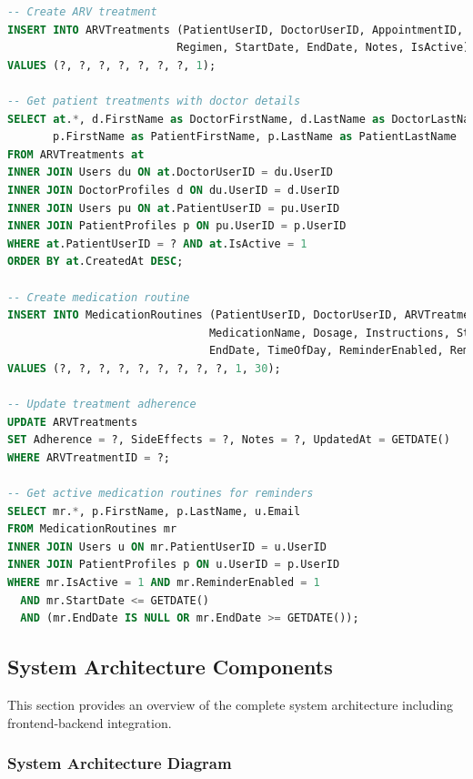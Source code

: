 \documentclass[12pt,a4paper]{article}
\begin{document}
\begin{lstlisting}[language=SQL, caption=ARV Treatment Management Queries]
-- Create ARV treatment
INSERT INTO ARVTreatments (PatientUserID, DoctorUserID, AppointmentID, 
                          Regimen, StartDate, EndDate, Notes, IsActive)
VALUES (?, ?, ?, ?, ?, ?, ?, 1);

-- Get patient treatments with doctor details
SELECT at.*, d.FirstName as DoctorFirstName, d.LastName as DoctorLastName,
       p.FirstName as PatientFirstName, p.LastName as PatientLastName
FROM ARVTreatments at
INNER JOIN Users du ON at.DoctorUserID = du.UserID
INNER JOIN DoctorProfiles d ON du.UserID = d.UserID
INNER JOIN Users pu ON at.PatientUserID = pu.UserID
INNER JOIN PatientProfiles p ON pu.UserID = p.UserID
WHERE at.PatientUserID = ? AND at.IsActive = 1
ORDER BY at.CreatedAt DESC;

-- Create medication routine
INSERT INTO MedicationRoutines (PatientUserID, DoctorUserID, ARVTreatmentID,
                               MedicationName, Dosage, Instructions, StartDate, 
                               EndDate, TimeOfDay, ReminderEnabled, ReminderMinutesBefore)
VALUES (?, ?, ?, ?, ?, ?, ?, ?, ?, 1, 30);

-- Update treatment adherence
UPDATE ARVTreatments 
SET Adherence = ?, SideEffects = ?, Notes = ?, UpdatedAt = GETDATE()
WHERE ARVTreatmentID = ?;

-- Get active medication routines for reminders
SELECT mr.*, p.FirstName, p.LastName, u.Email
FROM MedicationRoutines mr
INNER JOIN Users u ON mr.PatientUserID = u.UserID
INNER JOIN PatientProfiles p ON u.UserID = p.UserID
WHERE mr.IsActive = 1 AND mr.ReminderEnabled = 1
  AND mr.StartDate <= GETDATE() 
  AND (mr.EndDate IS NULL OR mr.EndDate >= GETDATE());
\end{lstlisting}

\subsection{System Architecture Components}

This section provides an overview of the complete system architecture including frontend-backend integration.

\subsubsection{System Architecture Diagram}
\end{document}
